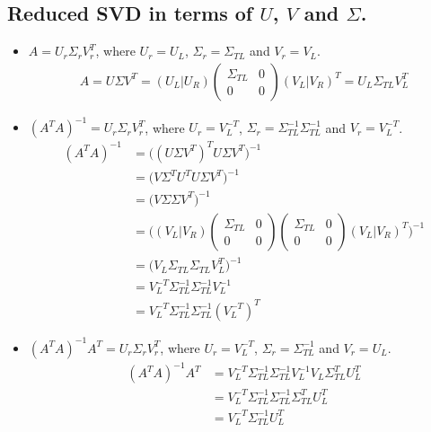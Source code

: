 \documentclass[11pt,a4paper]{article}
\begin{document}
\subsection{Reduced SVD in terms of $U$, $V$ and $\Sigma$.}
\begin{itemize}
    \item $A = U_r \Sigma_r V_r^T$, where 
        $U_r = U_L$, $\Sigma_r = \Sigma_{TL}$ and $V_r = V_L$.
\begin{align}
    A = U\Sigma V^T 
    = (U_L | U_R) 
    \left( \begin{array}{c|c} \Sigma_{TL} & 0 \\ \hline 0 & 0 \end{array} \right)
    (V_L | V_R)^T
    = U_L \Sigma_{TL} V_L^T
\end{align}

    \item $(A^TA)^{-1} = U_r \Sigma_r V_r^T$, where 
        $U_r = V_L^{-T}$, $\Sigma_r = \Sigma_{TL}^{-1}\Sigma_{TL}^{-1}$ and $V_r = V_L^{-T}$.
\begin{align}
    (A^TA)^{-1} &= \big((U\Sigma V^T)^T  U\Sigma V^T \big)^{-1} \\
    &= \big(V \Sigma^T U^T U\Sigma V^T \big)^{-1}  \\
    &= \big(V \Sigma \Sigma V^T \big)^{-1}  \\
    &= \Bigg( (V_L | V_R) 
    \left( \begin{array}{c|c} \Sigma_{TL} & 0 \\ \hline 0 & 0 \end{array} \right)
    \left( \begin{array}{c|c} \Sigma_{TL} & 0 \\ \hline 0 & 0 \end{array} \right)
    (V_L | V_R)^T \Bigg)^{-1} \\
    &= \big( V_L \Sigma_{TL} \Sigma_{TL} V_L^{T} \big)^{-1}  \\
    &= V_L^{-T} \Sigma_{TL}^{-1} \Sigma_{TL}^{-1} V_L^{-1}  \\
    &= V_L^{-T} \Sigma_{TL}^{-1} \Sigma_{TL}^{-1} (V_L^{-T})^{T}
\end{align}

    \item $(A^TA)^{-1} A^T = U_r \Sigma_r V_r^T$, where 
        $U_r = V_L^{-T}$, $\Sigma_r = \Sigma_{TL}^{-1}$ and $V_r = U_L$.
\begin{align}
    (A^TA)^{-1} A^T 
    &= V_L^{-T} \Sigma_{TL}^{-1} \Sigma_{TL}^{-1} V_L^{-1}  V_L \Sigma_{TL}^T U_L^T \\
    &= V_L^{-T} \Sigma_{TL}^{-1} \Sigma_{TL}^{-1} \Sigma_{TL}^T U_L^T \\
    &= V_L^{-T} \Sigma_{TL}^{-1} U_L^T
\end{align}


\end{itemize}
\end{document}
